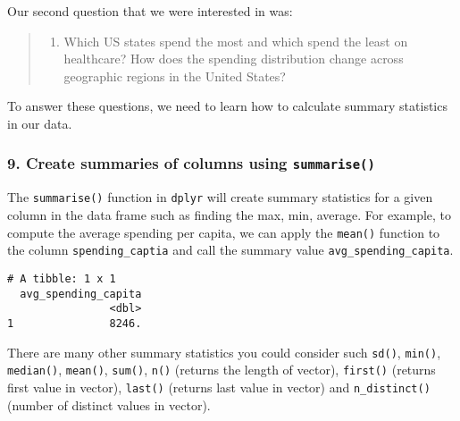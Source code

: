 \documentclass[]{article}
\newenvironment{Shaded}{\begin{snugshade}}{\end{snugshade}}
\newcommand{\DataTypeTok}[1]{\textcolor[rgb]{0.13,0.29,0.53}{#1}}
\newcommand{\KeywordTok}[1]{\textcolor[rgb]{0.13,0.29,0.53}{\textbf{#1}}}
\newcommand{\NormalTok}[1]{#1}
\newcommand{\OperatorTok}[1]{\textcolor[rgb]{0.81,0.36,0.00}{\textbf{#1}}}
\newcommand{\StringTok}[1]{\textcolor[rgb]{0.31,0.60,0.02}{#1}}
\providecommand{\tightlist}{%
  \setlength{\itemsep}{0pt}\setlength{\parskip}{0pt}}
\begin{document}
Our second question that we were interested in was:

\begin{quote}
\begin{enumerate}
\def\labelenumi{\arabic{enumi}.}
\setcounter{enumi}{1}
\tightlist
\item
  Which US states spend the most and which spend the least on
  healthcare? How does the spending distribution change across
  geographic regions in the United States?
\end{enumerate}
\end{quote}

To answer these questions, we need to learn how to calculate summary
statistics in our data.

\hypertarget{create-summaries-of-columns-using-summarise}{%
\subsubsection{\texorpdfstring{9. Create summaries of columns using
\texttt{summarise()}}{9. Create summaries of columns using summarise()}}\label{create-summaries-of-columns-using-summarise}}

The \texttt{summarise()} function in \texttt{dplyr} will create summary
statistics for a given column in the data frame such as finding the max,
min, average. For example, to compute the average spending per capita,
we can apply the \texttt{mean()} function to the column
\texttt{spending\_captia} and call the summary value
\texttt{avg\_spending\_capita}.

\begin{Shaded}
\end{Shaded}

\begin{verbatim}
# A tibble: 1 x 1
  avg_spending_capita
                <dbl>
1               8246.
\end{verbatim}

There are many other summary statistics you could consider such
\texttt{sd()}, \texttt{min()}, \texttt{median()}, \texttt{mean()},
\texttt{sum()}, \texttt{n()} (returns the length of vector),
\texttt{first()} (returns first value in vector), \texttt{last()}
(returns last value in vector) and \texttt{n\_distinct()} (number of
distinct values in vector).
\end{document}
